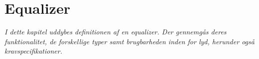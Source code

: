 \chapter{Equalizer}\label{kap:equalizer}
\vspace*{0.5 cm}
\emph{I dette kapitel uddybes definitionen af en equalizer. Der gennemgås deres funktionalitet, de forskellige typer samt brugbarheden inden for lyd, herunder også kravspecifikationer.}